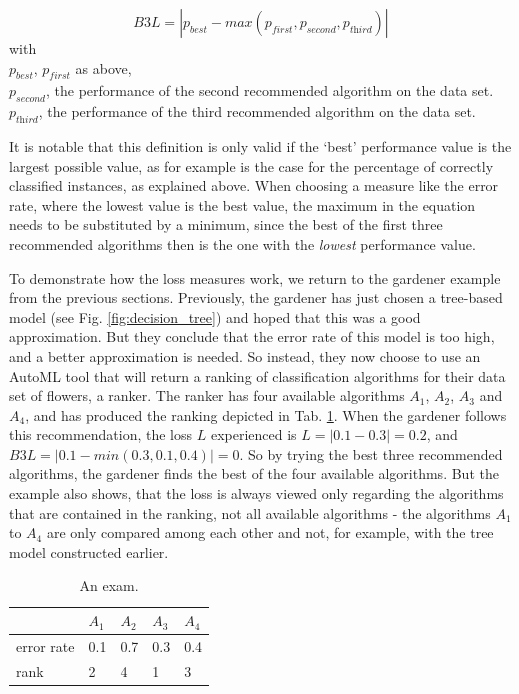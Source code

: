 $$\textit{B3L}=|p_{\textit{best}}-\textit{max}(p_{\textit{first}}, p_{\textit{second}}, p_{\textit{third}})|$$
with \\
$p_{\textit{best}}$, $p_{\textit{first}}$ as above, \\
$p_{\textit{second}}$, the performance of the second recommended algorithm on the data set. \\
$p_{\textit{third}}$, the performance of the third recommended algorithm on the data set.

It is notable that this definition is only valid if the `best' performance value is the largest possible value, as for example is the case for the percentage of correctly classified instances, as explained above. When choosing a measure like the error rate, where the lowest value is the best value, the maximum in the equation needs to be substituted by a minimum, since the best of the first three recommended algorithms then is the one with the \textit{lowest} performance value.

To demonstrate how the loss measures work, we return to the gardener example from the previous sections. Previously, the gardener has just chosen a tree-based model (see Fig. \ref{fig:decision_tree}) and hoped that this was a good approximation. But they conclude that the error rate of this model is too high, and a better approximation is needed. So instead, they now choose to use an AutoML tool that will return a ranking of classification algorithms for their data set of flowers, a ranker. The ranker has four available algorithms $A_1$, $A_2$, $A_3$ and $A_4$, and has produced the ranking depicted in Tab. \ref{tab:lossTable}. When the gardener follows this recommendation, the loss $L$ experienced is $L=|0.1-0.3|=0.2$, and $\textit{B3L}=|0.1-\textit{min}(0.3,0.1,0.4)|=0$. So by trying the best three recommended algorithms, the gardener finds the best of the four available algorithms. But the example also shows, that the loss is always viewed only regarding the algorithms that are contained in the ranking, not all available algorithms - the algorithms $A_1$ to $A_4$ are only compared among each other and not, for example, with the tree model constructed earlier.

\begin{table}
\begin{tabularx}{\textwidth}{X | X | X | X | X}
			& $A_1$	& $A_2$	& $A_3$	& $A_4$ \\\hline
error rate	& 0.1	& 0.7	& 0.3	& 0.4	\\
rank			& 2		& 4		& 1		& 3	
\end{tabularx}
\caption{An exam.}
\label{tab:lossTable}
\end{table}

